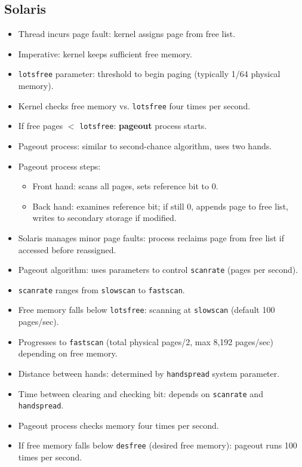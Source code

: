 \subsection{Solaris}
\begin{itemize}
    \item Thread incurs page fault: kernel assigns page from free list.
    \item Imperative: kernel keeps sufficient free memory.
    \item \texttt{lotsfree} parameter: threshold to begin paging (typically 1/64 physical memory).
    \item Kernel checks free memory vs. \texttt{lotsfree} four times per second.
    \item If free pages $<$ \texttt{lotsfree}: \textbf{pageout} process starts.
    \item Pageout process: similar to second-chance algorithm, uses two hands.
    \item Pageout process steps:
    \begin{itemize}
        \item Front hand: scans all pages, sets reference bit to 0.
        \item Back hand: examines reference bit; if still 0, appends page to free list, writes to secondary storage if modified.
    \end{itemize}
    \item Solaris manages minor page faults: process reclaims page from free list if accessed before reassigned.
    \item Pageout algorithm: uses parameters to control \texttt{scanrate} (pages per second).
    \item \texttt{scanrate} ranges from \texttt{slowscan} to \texttt{fastscan}.
    \item Free memory falls below \texttt{lotsfree}: scanning at \texttt{slowscan} (default 100 pages/sec).
    \item Progresses to \texttt{fastscan} (total physical pages/2, max 8,192 pages/sec) depending on free memory.
    \item Distance between hands: determined by \texttt{handspread} system parameter.
    \item Time between clearing and checking bit: depends on \texttt{scanrate} and \texttt{handspread}.
    \item Pageout process checks memory four times per second.
    \item If free memory falls below \texttt{desfree} (desired free memory): pageout runs 100 times per second.

\end{itemize}

